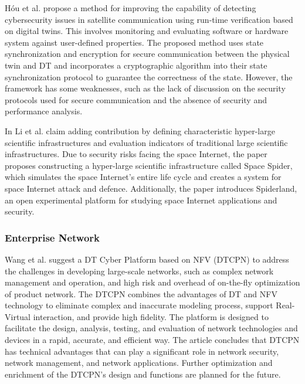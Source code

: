 Hóu et al.\cite{houDigitalTwinRuntime2022} propose a method for improving the capability of detecting cybersecurity issues in satellite communication using run-time verification based on digital twins. This involves monitoring and evaluating software or hardware system against user-defined properties. The proposed method uses state synchronization and encryption for secure communication between the physical twin and DT and incorporates a cryptographic algorithm into their state synchronization protocol to guarantee the correctness of the state. However, the framework has some weaknesses, such as the lack of discussion on the security protocols used for secure communication and the absence of security and performance analysis.

In \cite{jiaqiliSpaceSpiderHyper2022} Li et al. claim adding contribution by defining characteristic hyper-large scientific infrastructures and evaluation indicators of traditional large scientific infrastructures. Due to security risks facing the space Internet, the paper proposes constructing a hyper-large scientific infrastructure called Space Spider, which simulates the space Internet's entire life cycle and creates a system for space Internet attack and defence. Additionally, the paper introduces Spiderland, an open experimental platform for studying space Internet applications and security.

\subsubsection*{Enterprise Network}
 Wang et al.\cite{wangDTCPNDigitalTwin2022} suggest a DT Cyber Platform based on NFV (DTCPN) to address the challenges in developing large-scale networks, such as complex network management and operation, and high risk and overhead of on-the-fly optimization of product network. The DTCPN combines the advantages of DT and NFV technology to eliminate complex and inaccurate modeling process, support Real-Virtual interaction, and provide high fidelity. The platform is designed to facilitate the design, analysis, testing, and evaluation of network technologies and devices in a rapid, accurate, and efficient way. The article concludes that DTCPN has technical advantages that can play a significant role in network security, network management, and network applications. Further optimization and enrichment of the DTCPN's design and functions are planned for the future.

